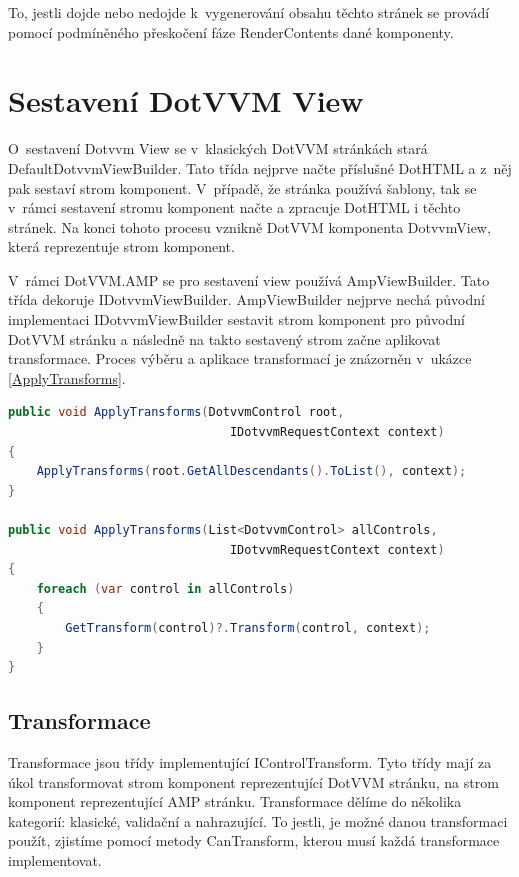  To, jestli dojde nebo nedojde k~vygenerování obsahu těchto stránek se provádí pomocí podmíněného přeskočení fáze RenderContents dané komponenty.
 
\section{Sestavení DotVVM View}
O~sestavení Dotvvm View se v~klasických DotVVM stránkách stará DefaultDotvvmViewBuilder. Tato třída nejprve načte příslušné DotHTML a z~něj pak sestaví strom komponent. V~případě, že stránka používá šablony, tak se v~rámci sestavení stromu komponent načte a zpracuje DotHTML i těchto stránek. Na konci tohoto procesu vznikně DotVVM komponenta  DotvvmView, která reprezentuje strom komponent.

V~rámci DotVVM.AMP se pro sestavení view používá AmpViewBuilder. Tato třída dekoruje IDotvvmViewBuilder. AmpViewBuilder nejprve nechá původní implementaci IDotvvmViewBuilder sestavit strom komponent pro původní DotVVM stránku a následně na takto sestavený strom začne aplikovat transformace. Proces výběru a aplikace transformací je znázorněn v~ukázce \ref{ApplyTransforms}. 
\begin{lstlisting}[language=c#, caption= Ukázka aplikace transformací ,label=ApplyTransforms,captionpos=t]
public void ApplyTransforms(DotvvmControl root,
                               IDotvvmRequestContext context)
{
    ApplyTransforms(root.GetAllDescendants().ToList(), context);
}

public void ApplyTransforms(List<DotvvmControl> allControls,
                               IDotvvmRequestContext context)
{
    foreach (var control in allControls)
    {
        GetTransform(control)?.Transform(control, context);
    }
}
\end{lstlisting}
\subsection*{Transformace}
Transformace jsou třídy implementující IControlTransform. Tyto třídy mají za úkol transformovat strom komponent reprezentující DotVVM stránku, na strom komponent reprezentující AMP stránku. Transformace dělíme do několika kategorií: klasické, validační a nahrazující. To jestli, je možné danou transformaci použít, zjistíme pomocí metody CanTransform, kterou musí každá transformace implementovat.
